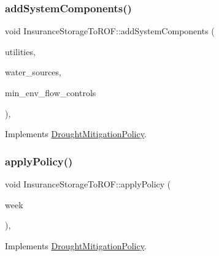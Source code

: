 \subsubsection{\texorpdfstring{add\+System\+Components()}{addSystemComponents()}}
{\footnotesize\ttfamily void Insurance\+Storage\+To\+R\+O\+F\+::add\+System\+Components (\begin{DoxyParamCaption}\item[{vector$<$ \mbox{\hyperlink{classUtility}{Utility}} $\ast$$>$}]{utilities,  }\item[{vector$<$ \mbox{\hyperlink{classWaterSource}{Water\+Source}} $\ast$$>$}]{water\+\_\+sources,  }\item[{vector$<$ \mbox{\hyperlink{classMinEnvFlowControl}{Min\+Env\+Flow\+Control}} $\ast$$>$}]{min\+\_\+env\+\_\+flow\+\_\+controls }\end{DoxyParamCaption})\hspace{0.3cm}{\ttfamily [override]}, {\ttfamily [virtual]}}



Implements \mbox{\hyperlink{classDroughtMitigationPolicy_aaab042a79d781afe8e08753b7012372a_aaab042a79d781afe8e08753b7012372a}{Drought\+Mitigation\+Policy}}.

\mbox{\label{classInsuranceStorageToROF_a17aa84e0559793b3c463c468dfda3753_a17aa84e0559793b3c463c468dfda3753}} 
\subsubsection{\texorpdfstring{apply\+Policy()}{applyPolicy()}}
{\footnotesize\ttfamily void Insurance\+Storage\+To\+R\+O\+F\+::apply\+Policy (\begin{DoxyParamCaption}\item[{int}]{week }\end{DoxyParamCaption})\hspace{0.3cm}{\ttfamily [override]}, {\ttfamily [virtual]}}



Implements \mbox{\hyperlink{classDroughtMitigationPolicy_a76c1a85eaf7707306fe173b6437cc31d_a76c1a85eaf7707306fe173b6437cc31d}{Drought\+Mitigation\+Policy}}.

\mbox{\label{classInsuranceStorageToROF_a4a50c4b15aba302fe1e928fb0cc66d32_a4a50c4b15aba302fe1e928fb0cc66d32}} 
